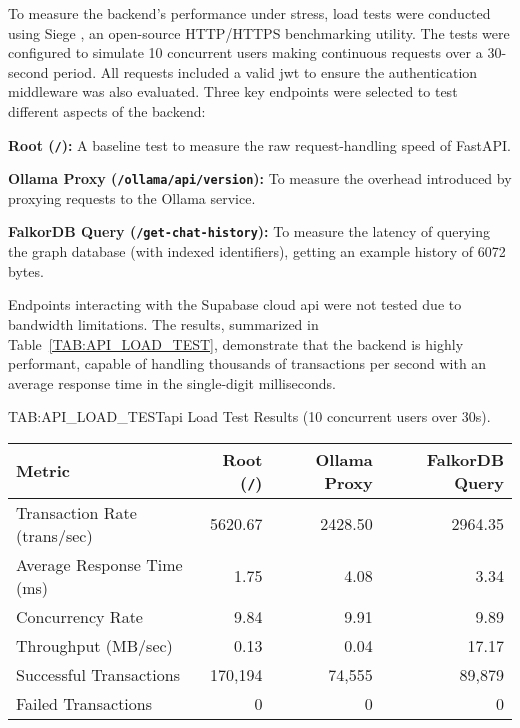To measure the backend's performance under stress, load tests were conducted using Siege \cite{SIEGE}, an open-source HTTP/HTTPS benchmarking utility. The tests were configured to simulate 10 concurrent users making continuous requests over a 30-second period. All requests included a valid \acs{jwt} to ensure the authentication middleware was also evaluated. Three key endpoints were selected to test different aspects of the backend:

\begin{compactitem}[\textbullet]
    \item \textbf{Root (\texttt{/}):} A baseline test to measure the raw request-handling speed of FastAPI.
    \item \textbf{Ollama Proxy (\texttt{/ollama/api/version}):} To measure the overhead introduced by proxying requests to the Ollama service.
    \item \textbf{FalkorDB Query (\texttt{/get-chat-history}):} To measure the latency of querying the graph database (with indexed identifiers), getting an example history of 6072 bytes.
\end{compactitem}

Endpoints interacting with the Supabase cloud \acs{api} were not tested due to bandwidth limitations. The results, summarized in Table~\ref{TAB:API_LOAD_TEST}, demonstrate that the backend is highly performant, capable of handling thousands of transactions per second with an average response time in the single-digit milliseconds.

\begin{table}[Load Test Results]{TAB:API_LOAD_TEST}{\acs{api} Load Test Results (10 concurrent users over 30s).}
    \centering
    \begin{tabular}{l r r r}
        \hline
        \textbf{Metric} & \textbf{Root (\texttt{/})} & \textbf{Ollama Proxy} & \textbf{FalkorDB Query} \\
        \hline
        Transaction Rate (trans/sec) & 5620.67 & 2428.50 & 2964.35 \\
        Average Response Time (ms) & 1.75 & 4.08 & 3.34 \\
        Concurrency Rate & 9.84 & 9.91 & 9.89 \\
        Throughput (MB/sec) & 0.13 & 0.04 & 17.17 \\
        Successful Transactions & 170,194 & 74,555 & 89,879 \\
        Failed Transactions & 0 & 0 & 0 \\
        \hline
    \end{tabular}
\end{table}